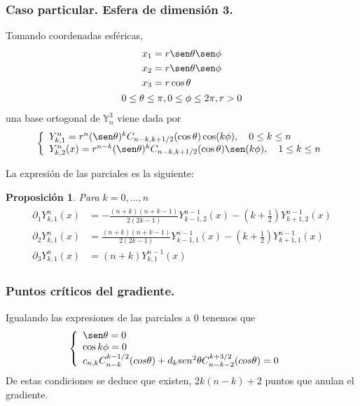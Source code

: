 \documentclass{beamer}
\theoremstyle{plain}
\theoremstyle{definition}
\theoremstyle{plain}
\newtheorem{prop}[thm]{Proposici\'{o}n}
\theoremstyle{definition}
\theoremstyle{remark}
\theoremstyle{definition}
\begin{document}
\begin{frame}
		\frametitle{Caso particular. Esfera de dimensión 3.}
		Tomando coordenadas esféricas,
		\begin{gather*}
		\begin{aligned}
		x_1 &= r \sen \theta \sen \phi\\
		x_2 &= r \sen \theta \sen \phi\\
		x_3 &= r \cos \theta\\
		\end{aligned}
		\\
		0\le \theta \le \pi,0\le\phi\le2\pi,r>0
		\end{gather*}
		una base ortogonal de $\mathds{Y}_n^3$ viene dada por
		\begin{equation*}
		\left\lbrace
		\begin{array}{ll}
		Y^n_ {k,1} = r^n(\sen \theta)^kC_{n-k,k+1/2}(\cos \theta) \cos(k\phi),\quad 0\le k\le n \\
		Y^n_{k,2}(x) = r^{n-k}(\sen\theta)^kC_{n-k,k+1/2}(\cos\theta)\sen(k\phi), \quad 1\le k\le n
		\end{array}
		\right.
		\end{equation*}
\end{frame}
\begin{frame}
La expresión de las parciales es la siguiente:
	\begin{prop} Para $k=0,...,n$
		\begin{gather*} 
		\begin{aligned}
		\partial_1Y^{n}_{k,1}(x) &= -\frac{(n+k)(n+k-1)}{2(2k-1)}Y^{n-1}_{k-1,2}(x)-(k+\frac{1}{2})Y^{n-1}_ {k+1,2}(x) \\
		\partial_2Y^{n}_{k,1}(x) &= \frac{(n+k)(n+k-1)}{2(2k-1)}Y^{n-1}_{k-1,1}(x)-(k+\frac{1}{2})Y^{n-1}_ {k+1,1}(x) \\
		\partial_3 Y_{k,1}^{n}(x) &=(n+k)Y_{k,1}^{n-1}(x)
		\end{aligned}
		\end{gather*}

	\end{prop}
\end{frame}
\begin{frame}
	\frametitle{Puntos críticos del gradiente.}

	Igualando las expresiones de las parciales a 0 tenemos que 
	\begin{gather*}
	\left\{
	\begin{array}{ll}
	\sen \theta= 0 \\
	\cos k\phi = 0 &\\
c_{n,k}C_{n-k}^{k-1/2}(cos \theta) + d_k sen^2\theta C_{n-k-2}^{k+3/2}(cos \theta) = 0
	\end{array}
	\right.
	\end{gather*}
	De estas condiciones se deduce que existen, $2k(n-k)+2$ puntos que anulan el gradiente.
\end{frame}
\end{document}
